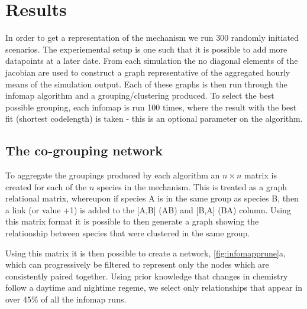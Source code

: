
\section{Results}

In order to get a representation of the mechanism we run 300 randomly initiated scenarios. The experiemental setup is one such that it is possible to add more datapoints at a later date. From each simulation the no diagonal elements of the jacobian are used to construct a graph representative of the aggregated hourly means of the simulation output. Each of these graphs is then run through the infomap algorithm and a grouping/clustering produced. To select the best possible grouping, each infomap is run 100 times, where the result with the best fit (shortest codelength) is taken - this is an optional parameter on the algorithm.

\subsection{The co-grouping network}

To aggregate the groupings produced by each algorithm an $n\times n$ matrix is created for each of the $n$ species in the mechanism. This is treated as a graph relational matrix, whereupon if species A is in the same group as species B, then a link (or value +1) is added to the [A,B] (A\ce{->}B) and [B,A] (B\ce{->}A) column. Using this matrix format it is possible to then generate a graph showing the relationship between species that were clustered in the same group.

Using this matrix it is then possible to create a network, \autoref{fig:infomapprune}a, which can progressively be filtered to represent only the nodes which are consistently paired together. Using prior knowledge that changes in chemistry follow a daytime and nightime regeme, we select only relationships that appear in over 45\% of all the infomap runs.

